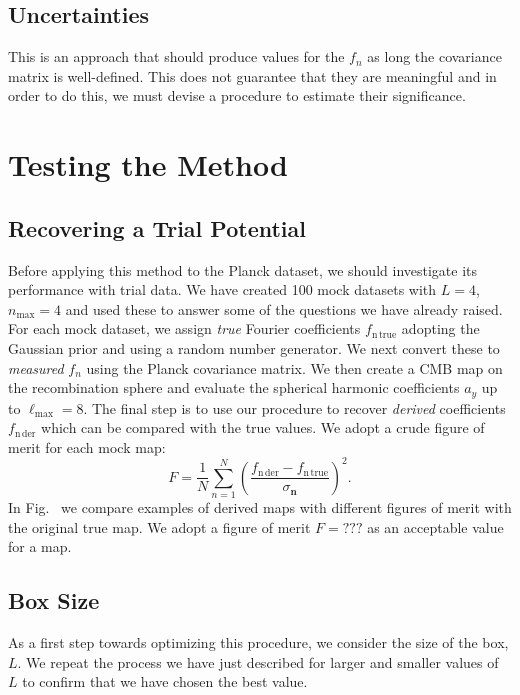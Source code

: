 \documentclass[useAMS,usenatbib,a4paper]{mn2e}
\begin{document}
\subsection{Uncertainties}

This is an approach that should produce values for the $f_n$ as long
the covariance matrix is well-defined. This does not guarantee that
they are meaningful and in order to do this, we must devise a
procedure to estimate their significance.


\section{Testing the Method}

\subsection{Recovering a Trial Potential}

Before applying this method to the Planck dataset, we should
investigate its performance with trial data. We have created 100 mock
datasets with $L=4$, $n_\mathrm{max}=4$ and used these to answer some
of the questions we have already raised. For each mock dataset, we
assign {\it true} Fourier coefficients $f_\mathrm{n\,true}$ adopting
the Gaussian prior and using a random number generator. We next
convert these to {\it measured} $f_n$ using the Planck covariance
matrix. We then create a CMB map on the recombination sphere and
evaluate the spherical harmonic coefficients $a_y$ up to
$\ell_\mathrm{max}=8$. The final step is to use our procedure to
recover {\it derived} coefficients $f_\mathrm{n\,der}$ which can be
compared with the true values. We adopt a crude  figure of merit for
each mock map:
\begin{equation}
F=\frac1N\sum_{n=1}^N\left(\frac{f_\mathrm{n\,der}-f_\mathrm{n\,true}}{\sigma_{\mathbf n}}\right)^2.
\end{equation}
In Fig.~ we compare examples of derived maps with different figures of
merit with the original true map. We adopt a figure of merit $F=???$
as an acceptable value for a map.

\subsection{Box Size}

As a first step towards optimizing this procedure, we consider the
size of the box, $L$. We repeat the process we have just described for
larger and smaller values of $L$ to confirm that we have chosen the
best value.
\end{document}

